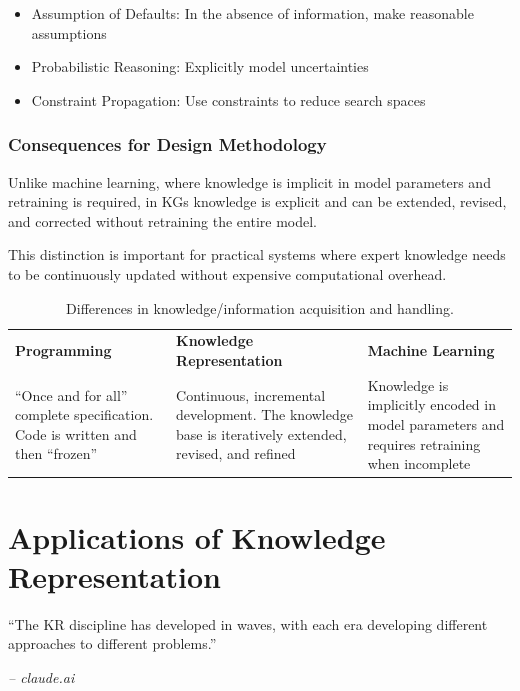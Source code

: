 \begin{itemize}
    \item Assumption of Defaults: In the absence of information, make reasonable assumptions
    \item Probabilistic Reasoning: Explicitly model uncertainties
    \item Constraint Propagation: Use constraints to reduce search spaces
\end{itemize}

\subsubsection*{Consequences for Design Methodology}
Unlike machine learning, where knowledge is implicit in model parameters and retraining is required, in KGs knowledge is explicit and can be extended, revised, and corrected without retraining the entire model.

This distinction is important for practical systems where expert knowledge needs to be continuously updated without
expensive computational overhead.

\begin{table}[H]
    \centering
    \begin{tabular}{p{5cm}p{5cm}p{5cm}}
        \textbf{Programming} & \textbf{Knowledge Representation} & \textbf{Machine Learning} \\
        ``Once and for all'' complete specification.
        Code is written and then ``frozen'' & Continuous, incremental
        development.
        The knowledge base is iteratively extended, revised, and refined
        &
        Knowledge is implicitly encoded in model parameters and requires retraining when incomplete
    \end{tabular}
    \caption{Differences in knowledge/information acquisition and handling.}\label{tab:table}
\end{table}



\section{Applications of Knowledge Representation}\label{sec:applications-of-knowledge-representation}
\begin{center}
    ``The KR discipline has developed in waves, with each era developing different approaches to different problems.''
\end{center}
\textit{-- claude.ai}

